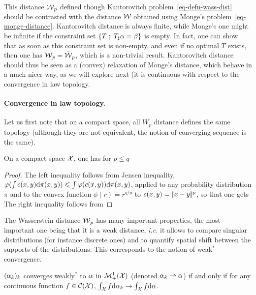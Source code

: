 This distance $\operatorname{\mathcal{W}}_p$ defined though Kantorovitch problem~\eqref{eq-defn-wass-dist} should be contrasted with the distance $\tilde{\operatorname{\mathcal{W}}}$ obtained using Monge's problem~\eqref{eq-monge-distance}. Kantorovitch distance is always finite, while Monge's one might be infinite if the constraint set $\left\{ T \;;\; T_\sharp \alpha=\beta \right\}$ is empty. In fact, one can show that as soon as this constraint set is non-empty, and even if no optimal $T$ exists, then one has $\operatorname{\mathcal{W}}_p = \tilde{\operatorname{\mathcal{W}}}_p$, which is a non-trivial result. Kantorovitch distance should thus be seen as a (convex) relaxation of Monge's distance, which behave in a much nicer way, as we will explore next (it is continuous with respect to the convergence in law topology.


\paragraph{Convergence in law topology.}

Let us first note that on a compact space, all $W_p$ distance defines the same topology (although they are not equivalent, the notion of converging sequence is the same).

\begin{prop}\label{prop-comp-wass-p}
	On a compact space $\mathcal{X}$, one has for $p \leq q$
\end{prop}
\begin{proof}
	The left inequality follows from Jensen inequality, $\varphi(\int c(x,y) \mathrm{d}\pi(x,y)) \leqslant \int \varphi(c(x,y)) \mathrm{d}\pi(x,y)$, applied to any probability distribution $\pi$ and to the convex function $\phi(r)=r^{q/p}$ to $c(x,y)=|\!| x-y |\!|^p$, so that one gets
	The right inequality follows from
\end{proof}

The Wasserstein distance $\operatorname{\mathcal{W}}_p$ has many important properties, the most important one being that it is a weak distance, \emph{i.e.} it allows to compare singular distributions (for instance discrete ones) and to quantify spatial shift between the supports of the distributions. This corresponds to the notion of weak$^*$ convergence.

\begin{defn}\label{dfn-weak-conv}
	$(\alpha_k)_k$ converges weakly$^*$ to $\alpha$ in $\mathcal{M}_+^1(\mathcal{X})$ (denoted $\alpha_k \rightharpoonup \alpha$) if and only if for any continuous function $f \in \mathcal{C}(\mathcal{X})$, $\int_{\mathcal{X}} f \mathrm{d}\alpha_k \rightarrow \int_{\mathcal{X}} f \mathrm{d}\alpha$.
\end{defn}


